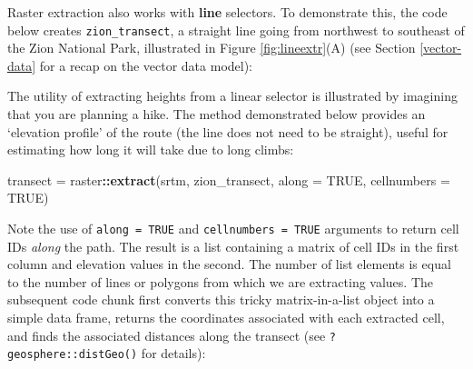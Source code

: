 \documentclass[]{krantz}
\newenvironment{Shaded}{\begin{snugshade}}{\end{snugshade}}
\newcommand{\DataTypeTok}[1]{\textcolor[rgb]{0.27,0.27,0.27}{#1}}
\newcommand{\FloatTok}[1]{\textcolor[rgb]{0.06,0.06,0.06}{#1}}
\newcommand{\KeywordTok}[1]{\textcolor[rgb]{0.27,0.27,0.27}{\textbf{#1}}}
\newcommand{\NormalTok}[1]{#1}
\newcommand{\OperatorTok}[1]{\textcolor[rgb]{0.43,0.43,0.43}{\textbf{#1}}}
\newcommand{\OtherTok}[1]{\textcolor[rgb]{0.37,0.37,0.37}{#1}}
\newcommand{\StringTok}[1]{\textcolor[rgb]{0.5,0.5,0.5}{#1}}
\begin{document}
Raster extraction also works with \textbf{line} selectors.
To demonstrate this, the code below creates \texttt{zion\_transect}, a straight line going from northwest to southeast of the Zion National Park, illustrated in Figure \ref{fig:lineextr}(A) (see Section \ref{vector-data} for a recap on the vector data model):

\begin{Shaded}
\end{Shaded}

The utility of extracting heights from a linear selector is illustrated by imagining that you are planning a hike.
The method demonstrated below provides an `elevation profile' of the route (the line does not need to be straight), useful for estimating how long it will take due to long climbs:

\begin{Shaded}
\begin{Highlighting}[]
\NormalTok{ transect =}\StringTok{ }\NormalTok{raster}\OperatorTok{::}\KeywordTok{extract}\NormalTok{(srtm, zion_transect, }
                            \DataTypeTok{along =} \OtherTok{TRUE}\NormalTok{, }\DataTypeTok{cellnumbers =} \OtherTok{TRUE}\NormalTok{)}
\end{Highlighting}
\end{Shaded}

Note the use of \texttt{along\ =\ TRUE} and \texttt{cellnumbers\ =\ TRUE} arguments to return cell IDs \emph{along} the path.
The result is a list containing a matrix of cell IDs in the first column and elevation values in the second.
The number of list elements is equal to the number of lines or polygons from which we are extracting values.
The subsequent code chunk first converts this tricky matrix-in-a-list object into a simple data frame, returns the coordinates associated with each extracted cell, and finds the associated distances along the transect (see \texttt{?geosphere::distGeo()} for details):
\end{document}
